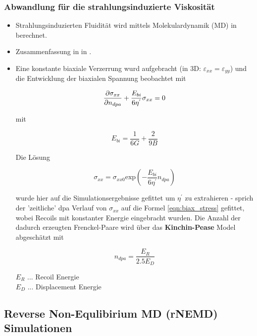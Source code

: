 \documentclass[a4paper, 10pt, 
               numbers=noenddot, toc=graduated,
               headsepline=true, footsepline=true,
               twoside=false, titlepage=true, 
               bibliography=totoc]{scrartcl}
\begin{document}
	\subsubsection{Abwandlung für die strahlungsinduzierte Viskosität}
	\begin{itemize}

 		 \item Strahlungsinduzierten Fluidität wird mittels Molekulardynamik (MD) in \cite{Mayr2003} berechnet. 
  		 \item Zusammenfassung in in \cite{hobler2017hpm}.
  
  		  \item Eine konstante biaxiale Verzerrung wurd aufgebracht (in 3D: $\varepsilon_{xx} = \varepsilon_{yy}$) und die Entwicklung der biaxialen Spannung beobachtet mit 

   		 	\begin{equation}
	    		\pdv{\sigma_{xx}}{n_{dpa}} + \frac{E_{bi}}{6\eta^{'}}\sigma_{xx} = 0
    		\end{equation}

    		mit 

    		\begin{equation}
	   		 	E_{bi} = \frac{1}{6G} + \frac{2}{9B} 
    		\end{equation}

   			 Die Lösung 

    		\begin{equation}\label{eqn:biax_stress}
	    		\sigma_{xx} = \sigma_{xx0} \mathrm{exp} \left( -\frac{E_{bi}}{6\eta^{'}} n_{dpa} \right) 
    		\end{equation}

   			 wurde hier auf die Simulationsergebnisse gefittet um $\eta^{'}$ zu extrahieren - sprich der 'zeitliche' dpa Verlauf von $\sigma_{xx}$ auf die Formel \ref{eqn:biax_stress} gefittet, wobei Recoils mit konstanter Energie eingebracht wurden. Die Anzahl der dadurch erzeugten Frenckel-Paare wird über das \textbf{Kinchin-Pease} Model abgeschätzt mit 

   			 \begin{equation}
	   		 	n_{dpa} = \frac{E_R}{2.5 E_D}
   			 \end{equation}

    		$E_R$ ... Recoil Energie\\
   			 $E_D$ ... Displacement Energie
    
    \end{itemize}
    

\subsection{Reverse Non-Equlibirium MD  (rNEMD) Simulationen}
\end{document}
